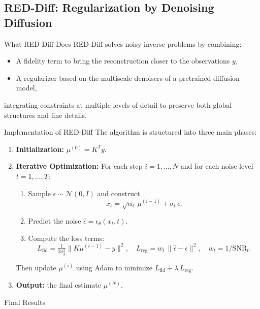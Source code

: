 
\subsection{RED-Diff: Regularization by Denoising Diffusion}

\begin{frame}{What RED-Diff Does}
  RED-Diff solves noisy inverse problems by combining:
  \begin{itemize}
    \item A fidelity term to bring the reconstruction closer to the observations $y$,
    \item A regularizer based on the multiscale denoisers of a pretrained diffusion model,
  \end{itemize}
  integrating constraints at multiple levels of detail to preserve both global structures and fine details.
\end{frame}

\begin{frame}[fragile]{Implementation of RED-Diff}
  The algorithm is structured into three main phases:
  \begin{enumerate}
    \item \textbf{Initialization:} $\mu^{(0)} = K^T y$.
    \item \textbf{Iterative Optimization:}
      For each step $i=1,\dots,N$ and for each noise level $t=1,\dots,T$:
      \begin{enumerate}
        \item Sample $\epsilon\sim\mathcal{N}(0,I)$ and construct
          \[x_t = \sqrt{\alpha_t}\,\mu^{(i-1)} + \sigma_t\,\epsilon.\]
        \item Predict the noise $\hat\epsilon = \epsilon_\theta(x_t,t)$.
        \item Compute the loss terms:
          \[
            L_{\mathrm{fid}} = \tfrac{1}{2\sigma_y^2}\|K\mu^{(i-1)} - y\|^2,
            \quad
            L_{\mathrm{reg}} = w_t\,\|\hat\epsilon - \epsilon\|^2,
            \quad w_t = 1/\mathrm{SNR}_t.
          \]
      \end{enumerate}
      Then update $\mu^{(i)}$ using Adam to minimize $L_{\mathrm{fid}} + \lambda\,L_{\mathrm{reg}}$.
    \item \textbf{Output:} the final estimate $\mu^{(N)}$.
  \end{enumerate}
\end{frame}

\begin{frame}{Final Results}
\end{frame}
